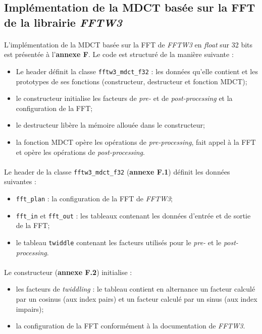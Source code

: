 \documentclass{article}
\begin{document}
    \subsection{Implémentation de la MDCT basée sur la FFT de la librairie \emph{FFTW3}}

    \paragraph{}
    L'implémentation de la MDCT basée sur la FFT de \emph{FFTW3} en \emph{float} sur 32 bits est présentée à l'\textbf{annexe F}. Le code est structuré de la manière suivante :
    \begin{itemize}
        \item Le header définit la classe \texttt{fftw3\_mdct\_f32} : les données qu'elle contient et les prototypes de ses fonctions (constructeur, destructeur et fonction MDCT);
        \item le constructeur initialise les facteurs de \emph{pre-} et de \emph{post-processing} et la configuration de la FFT;
        \item le destructeur libère la mémoire allouée dans le constructeur;
        \item la fonction MDCT opère les opérations de \emph{pre-processing}, fait appel à la FFT et opère les opérations de \emph{post-processing}.
    \end{itemize}

    \paragraph{}
    Le header de la classe \texttt{fftw3\_mdct\_f32} (\textbf{annexe F.1}) définit les données suivantes :
    \begin{itemize}
        \item \texttt{fft\_plan} : la configuration de la FFT de \emph{FFTW3};
        \item \texttt{fft\_in} et \texttt{fft\_out} : les tableaux contenant les données d'entrée et de sortie de la FFT;
        \item le tableau \texttt{twiddle} contenant les facteurs utilisés pour le \emph{pre-} et le \emph{post-processing}.
    \end{itemize}

    \paragraph{}
    Le constructeur (\textbf{annexe F.2}) initialise :
    \begin{itemize}
        \item les facteurs de \emph{twiddling} : le tableau contient en alternance un facteur calculé par un cosinus (aux index pairs) et un facteur calculé par un sinus (aux index impairs);
        \item la configuration de la FFT conformément à la documentation de \emph{FFTW3}.
    \end{itemize}
\end{document}
